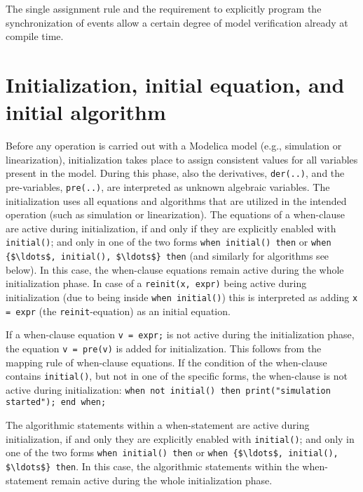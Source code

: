 \begin{nonnormative}
The single assignment rule and the requirement to explicitly
program the synchronization of events allow a certain degree of model
verification already at compile time.
\end{nonnormative}

\section{Initialization, initial equation, and initial algorithm}

Before any operation is carried out with a Modelica model (e.g.,
simulation or linearization), initialization takes place to assign
consistent values for all variables present in the model. During this
phase, also the derivatives, \lstinline!der(..)!, and the pre-variables, \lstinline!pre(..)!,
are interpreted as unknown algebraic variables. The initialization uses
all equations and algorithms that are utilized in the intended operation
(such as simulation or linearization).  The equations of a
when-clause are active during initialization, if and only if they are
explicitly enabled with \lstinline!initial()!; and only in one of the
two forms \lstinline!when initial() then! or \lstinline[mathescape=true]!when {$\ldots$, initial(), $\ldots$} then!
(and similarly for algorithms see below). In this case, the when-clause equations remain active during the
whole initialization phase. In case of a
\lstinline!reinit(x, expr)! being active during initialization (due to being inside
\lstinline!when initial()!) this is interpreted as adding \lstinline!x = expr! (the
\lstinline!reinit!-equation) as an initial equation.

\begin{nonnormative}
If a when-clause equation \lstinline!v = expr;! is not active during the initialization phase, the equation \lstinline!v = pre(v)! is added for
initialization.  This follows from the mapping rule of when-clause equations.  If the condition of the when-clause contains \lstinline!initial()!,
but not in one of the specific forms, the when-clause is not active during initialization: \lstinline!when not initial() then print("simulation started"); end when;!
\end{nonnormative}

The algorithmic statements within a when-statement are active during initialization, if and only they are
explicitly enabled with \lstinline!initial()!; and only in one of the
two forms \lstinline!when initial() then! or \lstinline[mathescape=true]!when {$\ldots$, initial(), $\ldots$} then!.
In this case, the algorithmic statements within the when-statement remain active during the whole initialization phase.


